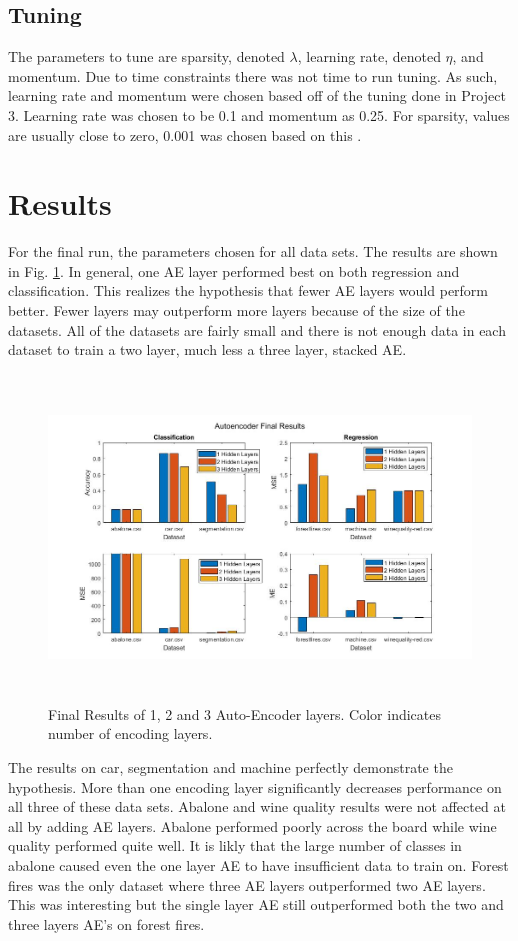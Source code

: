 \documentclass[twoside,11pt]{article}
\begin{document}
\subsection{Tuning}
	 The parameters to tune are sparsity, denoted $\lambda$, learning rate, denoted $\eta$, and momentum. Due to time constraints there was not time to run tuning. As such, learning rate and momentum were chosen based off of the tuning done in Project 3. Learning rate was chosen to be 0.1 and momentum as 0.25. For sparsity, values are usually close to zero, 0.001 was chosen based on this \citep{sparsity}.
\section{Results}
	For the final run, the parameters chosen for all data sets. The results are shown in Fig. \ref{auto-encoder}. In general, one AE layer performed best on both regression and classification. This realizes the hypothesis that fewer AE layers would perform better. Fewer layers may outperform more layers because of the size of the datasets. All of the datasets are fairly small and there is not enough data in each dataset to train a two layer, much less a three layer, stacked AE. 
	\begin{figure}[h]
		\centering
		\includegraphics[height=3.4in]{AEresults.jpg}
		\caption{Final Results of 1, 2 and 3 Auto-Encoder layers. Color indicates number of encoding layers.}
		\label{auto-encoder}
	\end{figure}
	The results on car, segmentation and machine perfectly demonstrate the hypothesis. More than one encoding layer significantly decreases performance on all three of these data sets. Abalone and wine quality results were not affected at all by adding AE layers. Abalone performed poorly across the board while wine quality performed quite well. It is likly that the large number of classes in abalone caused even the one layer AE to have insufficient data to train on. Forest fires was the only dataset where three AE layers outperformed two AE layers. This was interesting but the single layer AE still outperformed both the two and three layers AE's on forest fires.
	
\end{document}
